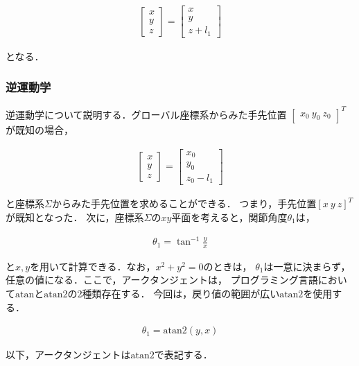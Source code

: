 \begin{align}
  \begin{bmatrix}
    x \\
    y \\
    z
  \end{bmatrix}
  = 
  \begin{bmatrix}
    x \\
    y \\
    z + l_1
  \end{bmatrix} \tag{2.3}
\end{align}

となる．

\subsubsection{逆運動学}
逆運動学について説明する．グローバル座標系からみた手先位置
$\begin{bmatrix} x_0 \ y_0 \ z_0 \end{bmatrix}^T$が既知の場合，

\begin{align}
  \begin{bmatrix} x \\ y \\ z \end{bmatrix} = \begin{bmatrix} x_0 \\ y_0 \\ z_0 - l_1 \end{bmatrix} \tag{2.4}
\end{align}

と座標系$\Sigma$からみた手先位置を求めることができる．
つまり，手先位置$[x \ y \ z]^T$が既知となった．
次に，座標系$\Sigma$の$xy$平面を考えると，関節角度$\theta_1$は，

\begin{align}
  \theta_1 = \tan^{-1} \frac{y}{x} \tag{2.5}
\end{align}

と$x, y$を用いて計算できる．なお，$x^2 + y^2 = 0$のときは，
$\theta_1$は一意に決まらず，任意の値になる．ここで，アークタンジェントは，
プログラミング言語において$\text{atan}$と$\text{atan2}$の2種類存在する．
今回は，戻り値の範囲が広い$\text{atan2}$を使用する．

\begin{align}
  \theta_1 = \text{atan2}(y, x) \tag{2.6}
\end{align}

以下，アークタンジェントは$\text{atan2}$で表記する．

